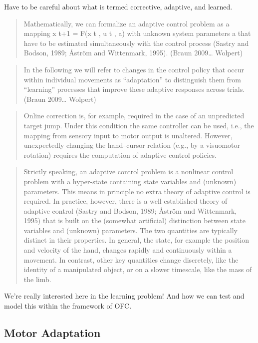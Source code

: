 Have to be careful about what is termed corrective, adaptive, and
learned.

\begin{quote}
Mathematically, we can formalize an adaptive control problem as a
mapping x t+1 = F(x t , u t , a) with unknown system parameters a that
have to be estimated simultaneously with the control process (Sastry and
Bodson, 1989; Åström and Wittenmark, 1995). (Braun 2009\ldots{} Wolpert)
\end{quote}

\begin{quote}
In the following we will refer to changes in the control policy that
occur within individual movements as ``adaptation'' to distinguish them
from ``learning'' processes that improve these adaptive responses across
trials. (Braun 2009\ldots{} Wolpert)
\end{quote}

\begin{quote}
Online correction is, for example, required in the case of an
unpredicted target jump. Under this condition the same controller can be
used, i.e., the mapping from sensory input to motor output is unaltered.
However, unexpectedly changing the hand--cursor relation (e.g., by a
visuomotor rotation) requires the computation of adaptive control
policies.
\end{quote}

\begin{quote}
Strictly speaking, an adaptive control problem is a nonlinear control
problem with a hyper-state containing state variables and (unknown)
parameters. This means in principle no extra theory of adaptive control
is required. In practice, however, there is a well established theory of
adaptive control (Sastry and Bodson, 1989; Åström and Wittenmark, 1995)
that is built on the (somewhat artificial) distinction between state
variables and (unknown) parameters. The two quantities are typically
distinct in their properties. In general, the state, for example the
position and velocity of the hand, changes rapidly and continuously
within a movement. In contrast, other key quantities change discretely,
like the identity of a manipulated object, or on a slower timescale,
like the mass of the limb.
\end{quote}

We're really interested here in the learning problem! And how we can
test and model this within the framework of OFC.

\subsection{Motor Adaptation}\label{motor-adaptation}

